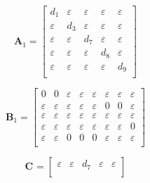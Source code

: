 \documentclass[11pt, a4paper, fleqn]{article}
\begin{document}
\begin{equation*}
\mathbf{A}_{1} = 
\left[\begin{array}{ ccccc }
d_1	&\varepsilon	&\varepsilon	&\varepsilon	&\varepsilon\\
\varepsilon	&d_3	&\varepsilon	&\varepsilon	&\varepsilon\\
\varepsilon	&\varepsilon	&d_7	&\varepsilon	&\varepsilon\\
\varepsilon	&\varepsilon	&\varepsilon	&d_8	&\varepsilon\\
\varepsilon	&\varepsilon	&\varepsilon	&\varepsilon	&d_9\\
\end{array}\right]
\end{equation*}

\begin{equation*}
\mathbf{B}_{1} = 
\left[\begin{array}{ cccccccc }
0	&0	&\varepsilon	&\varepsilon	&\varepsilon	&\varepsilon	&\varepsilon	&\varepsilon\\
\varepsilon	&\varepsilon	&\varepsilon	&\varepsilon	&\varepsilon	&0	&0	&\varepsilon\\
\varepsilon	&\varepsilon	&\varepsilon	&\varepsilon	&\varepsilon	&\varepsilon	&\varepsilon	&\varepsilon\\
\varepsilon	&\varepsilon	&\varepsilon	&\varepsilon	&\varepsilon	&\varepsilon	&\varepsilon	&0\\
\varepsilon	&\varepsilon	&0	&0	&0	&\varepsilon	&\varepsilon	&\varepsilon\\
\end{array}\right]
\end{equation*}

\begin{equation*}
\mathbf{C}_{{}} = 
\left[\begin{array}{ ccccc }
\varepsilon	&\varepsilon	&d_7	&\varepsilon	&\varepsilon\\
\end{array}\right]
\end{equation*}
\end{document}
